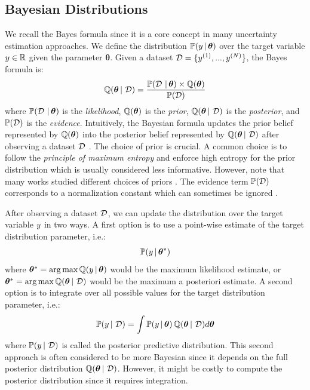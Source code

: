 \subsection{Bayesian Distributions} We recall the Bayes formula since it is a core concept in many uncertainty estimation approaches.
We define the distribution $\mathbb{P}(y \,|\, \bm{\theta})$ over the target variable $y \in \operatorname{\mathbb{R}}$ given the parameter $\bm{\theta}$.
Given a dataset $\operatorname{\mathcal{D}}=\{y^{(1)}, ..., y^{(N)}\}$, the Bayes formula is:
\begin{equation}
    \operatorname{\mathbb{Q}}(\bm{\theta} \,|\, \operatorname{\mathcal{D}}) = \frac{\mathbb{P}(\operatorname{\mathcal{D}} \,|\, \bm{\theta}) \times \operatorname{\mathbb{Q}}(\bm{\theta})}{\mathbb{P}(\operatorname{\mathcal{D}})}
\end{equation}
where $\mathbb{P}(\operatorname{\mathcal{D}} \,|\, \bm{\theta})$ is the \emph{likelihood}, $\operatorname{\mathbb{Q}}(\bm{\theta})$ is the \emph{prior}, $\operatorname{\mathbb{Q}}(\bm{\theta} \,|\, \operatorname{\mathcal{D}})$ is the \emph{posterior}, and $\mathbb{P}(\operatorname{\mathcal{D}})$ is the \emph{evidence}.
Intuitively, the Bayesian formula updates the prior belief represented by $\operatorname{\mathbb{Q}}(\bm{\theta})$ into the posterior belief represented by $\operatorname{\mathbb{Q}}(\bm{\theta} \,|\, \operatorname{\mathcal{D}})$ after observing a dataset $\operatorname{\mathcal{D}}$ \cite{bishop}.
The choice of prior is crucial. A common choice is to follow the \emph{principle of maximum entropy} \citep{maximum-entropy-principle} and enforce high entropy for the prior distribution which is usually considered less informative. However, note that many works studied different choices of priors \cite{jeffreys1946prior, silvestro2020prior}.
The evidence term $\mathbb{P}(\operatorname{\mathcal{D}})$ corresponds to a normalization constant which can sometimes be ignored \cite{bishop}.

After observing a dataset $\operatorname{\mathcal{D}}$, we can update the distribution over the target variable $y$ in two ways.
A first option is to use a point-wise estimate of the target distribution parameter, i.e.:
\begin{equation}
    \mathbb{P}(y \,|\, \bm{\theta}^*)
\end{equation}
where $\bm{\theta}^*=\operatorname*{arg\,max}\operatorname{\mathbb{Q}}(y \,|\, \bm{\theta})$ would be the maximum likelihood estimate, or $\bm{\theta}^*=\operatorname*{arg\,max}\operatorname{\mathbb{Q}}(\bm{\theta} \,|\, \operatorname{\mathcal{D}})$ would be the maximum a posteriori estimate.
A second option is to integrate over all possible values for the target distribution parameter, i.e.:
\begin{equation}
    \label{eq:posterior_predictive}
    \mathbb{P}(y \,|\, \operatorname{\mathcal{D}}) = \int \mathbb{P}(y \,|\, \bm{\theta}) \operatorname{\mathbb{Q}}(\bm{\theta} \,|\, \operatorname{\mathcal{D}}) d\bm{\theta}
\end{equation}
where $\mathbb{P}(y \,|\, \operatorname{\mathcal{D}})$ is called the posterior predictive distribution. 
This second approach is often considered to be more Bayesian since it depends on the full posterior distribution $\operatorname{\mathbb{Q}}(\bm{\theta} \,|\, \operatorname{\mathcal{D}})$.
However, it might be costly to compute the posterior distribution since it requires integration.

